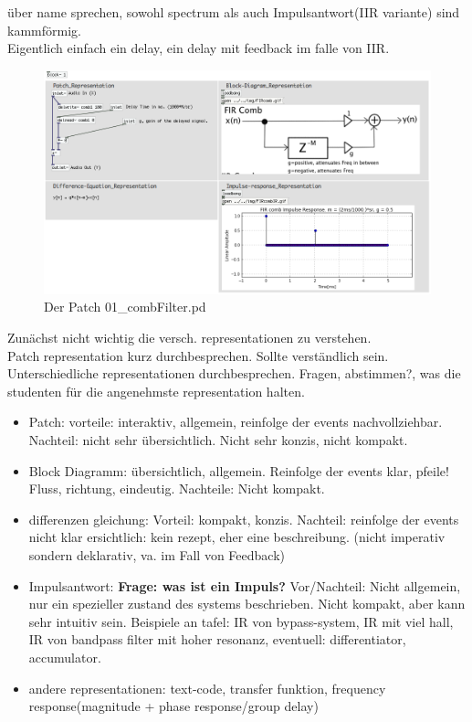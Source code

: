 über name sprechen, sowohl spectrum als auch Impulsantwort(IIR variante) sind kammförmig. \\
Eigentlich einfach ein delay, ein delay mit feedback im falle von IIR.\\




\begin{figure}[h]
	\begin{center}
		\includegraphics[width = 14cm]{img/combFIR_patch.png}
		\caption{Der Patch 01\_combFilter.pd}
		\label{fig:01_combFilter}
	\end{center}
\end{figure}



Zunächst nicht wichtig die versch. representationen zu verstehen. \\
Patch representation kurz durchbesprechen. Sollte verständlich sein.\\

Unterschiedliche representationen durchbesprechen.
Fragen, abstimmen?, was die studenten für die angenehmste representation halten.



\begin{itemize}
	\item Patch: vorteile: interaktiv, allgemein, reinfolge der events nachvollziehbar. Nachteil: nicht sehr übersichtlich. Nicht sehr konzis, nicht kompakt.
	\item Block Diagramm: übersichtlich, allgemein. Reinfolge der events klar, pfeile! Fluss, richtung, eindeutig. Nachteile: Nicht kompakt.
	\item differenzen gleichung: Vorteil: kompakt, konzis. Nachteil: reinfolge der events nicht klar ersichtlich: kein rezept, eher eine beschreibung. (nicht imperativ sondern deklarativ, va. im Fall von Feedback)
	\item Impulsantwort: \textbf{Frage: was ist ein Impuls?}  Vor/Nachteil: Nicht allgemein, nur ein spezieller zustand des systems beschrieben. Nicht kompakt, aber kann sehr intuitiv sein. Beispiele an tafel: IR von bypass-system, IR mit viel hall, IR von bandpass filter mit hoher resonanz, eventuell: differentiator, accumulator.
	\item andere representationen: text-code, transfer funktion, frequency response(magnitude + phase response/group delay)
\end{itemize}




